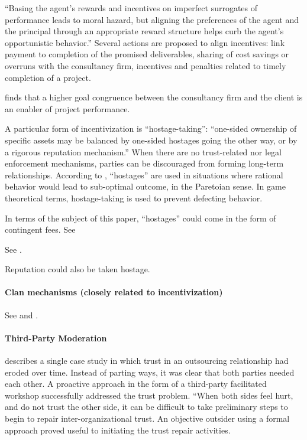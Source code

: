 \documentclass[12pt]{article}
\begin{document}
``Basing the agent's rewards and incentives on imperfect surrogates of
performance leads to moral hazard, but aligning the preferences of the
agent and the principal through an appropriate reward structure helps
curb the agent's opportunistic behavior.'' \citep[ 13-15]{basu2011}
Several actions are proposed to align incentives: link payment to
completion of the promised deliverables, sharing of cost savings or
overruns with the consultancy firm, incentives and penalties related to
timely completion of a project.

\citet[264-266]{liberatore2010} finds that a higher goal congruence
between the consultancy firm and the client is an enabler of project
performance.

A particular form of incentivization is ``hostage-taking'': ``one-sided
ownership of specific assets may be balanced by one-sided hostages going
the other way, or by a rigorous reputation mechanism.'' \citep[
924]{nooteboom2000} When there are no trust-related nor legal
enforcement mechanisms, parties can be discouraged from forming
long-term relationships. According to \citet[47-48]{werner1993},
``hostages'' are used in situations where rational behavior would lead
to sub-optimal outcome, in the Paretoian sense. In game theoretical
terms, hostage-taking is used to prevent defecting behavior.

In terms of the subject of this paper, ``hostages'' could come in the
form of contingent fees. See \citep[ 243]{clark1993}

See \citet{tosi1997}.

Reputation could also be taken hostage. \citep[ 368]{shapiro1992}

\hypertarget{clan-mechanisms-closely-related-to-incentivization}{%
\paragraph{Clan mechanisms (closely related to
incentivization)}\label{clan-mechanisms-closely-related-to-incentivization}}

See \citet[62]{aubert1996} and \citet{ouchi1980}.

\hypertarget{third-party-moderation}{%
\paragraph{Third-Party Moderation}\label{third-party-moderation}}

\citet[6-7]{babin2017} describes a single case study in which trust in
an outsourcing relationship had eroded over time. Instead of parting
ways, it was clear that both parties needed each other. A proactive
approach in the form of a third-party facilitated workshop successfully
addressed the trust problem. ``When both sides feel hurt, and do not
trust the other side, it can be difficult to take preliminary steps to
begin to repair inter-organizational trust. An objective outsider using
a formal approach proved useful to initiating the trust repair
activities.
\end{document}
